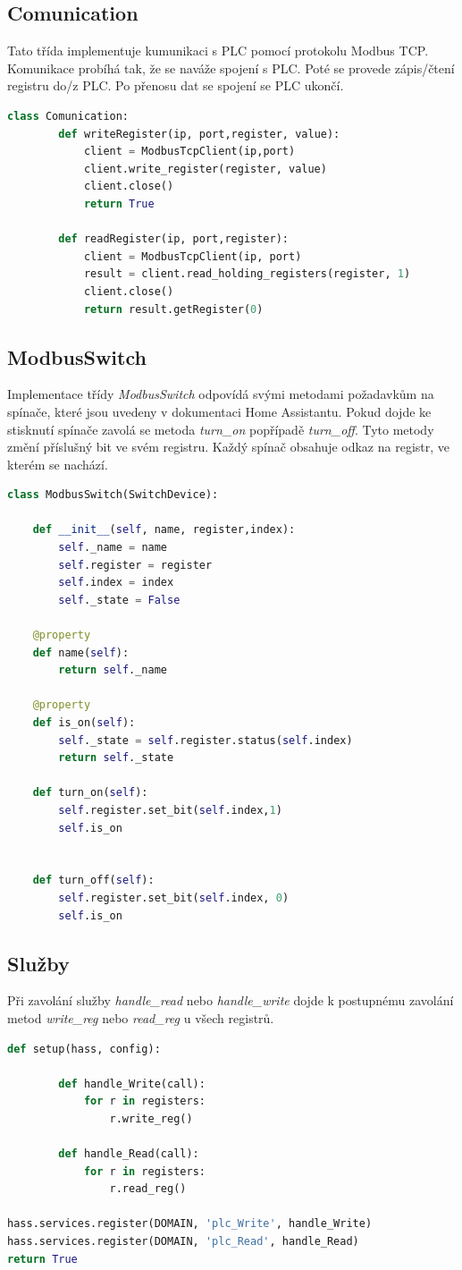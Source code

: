 \documentclass[a4paper,12pt,czech,bibliography=totoc]{scrbook}
\begin{document}
\subsection{Comunication}
Tato třída implementuje kumunikaci s PLC pomocí protokolu Modbus TCP. Komunikace probíhá tak, že se naváže spojení s PLC. Poté se provede zápis/čtení registru do/z PLC. Po přenosu dat se spojení se PLC ukončí.
\begin{lstlisting}[language=Python]
	class Comunication:
		def writeRegister(ip, port,register, value):
			client = ModbusTcpClient(ip,port)
			client.write_register(register, value)
			client.close()
			return True

		def readRegister(ip, port,register):
			client = ModbusTcpClient(ip, port)
			result = client.read_holding_registers(register, 1)
			client.close()
			return result.getRegister(0)

\end{lstlisting}
\subsection{ModbusSwitch}
Implementace třídy \textit{ModbusSwitch} odpovídá svými metodami požadavkům na spínače, které jsou uvedeny v dokumentaci Home Assistantu. Pokud dojde ke stisknutí spínače zavolá se metoda \textit{turn\_on} popřípadě \textit{turn\_off}. Tyto metody změní příslušný bit ve svém registru. Každý spínač obsahuje odkaz na registr, ve kterém se nachází. \newpage
\begin{lstlisting}[language=Python]
class ModbusSwitch(SwitchDevice):

	def __init__(self, name, register,index):
		self._name = name
		self.register = register
		self.index = index
		self._state = False

	@property
	def name(self):
		return self._name

	@property
	def is_on(self):
		self._state = self.register.status(self.index)
		return self._state

	def turn_on(self):
		self.register.set_bit(self.index,1)
		self.is_on


	def turn_off(self):
		self.register.set_bit(self.index, 0)
		self.is_on
\end{lstlisting}

\subsection{Služby}
Při zavolání služby \textit{handle\_read} nebo \textit{handle\_write} dojde k postupnému zavolání metod \textit{write\_reg} nebo  \textit{read\_reg} u všech registrů.
\begin{lstlisting}[language=Python]
	def setup(hass, config):

		def handle_Write(call):
			for r in registers:
				r.write_reg()

		def handle_Read(call):
			for r in registers:
				r.read_reg()

hass.services.register(DOMAIN, 'plc_Write', handle_Write)
hass.services.register(DOMAIN, 'plc_Read', handle_Read)	
return True
\end{lstlisting}
\end{document}
